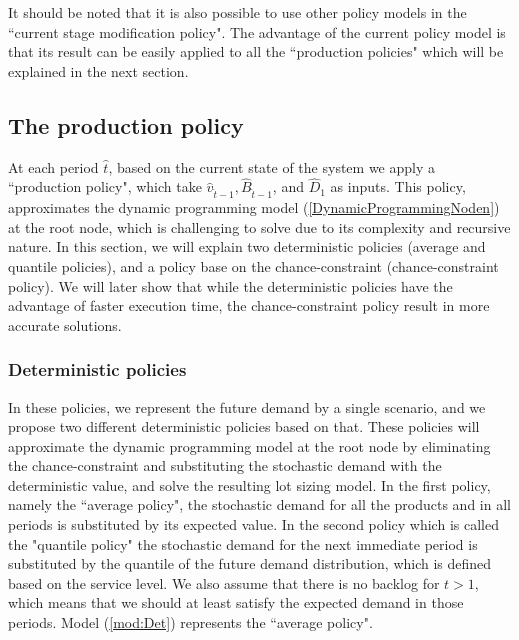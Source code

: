 \documentclass[10pt]{article}
\newcommand{\ti}{t} %
\newcommand{\tAct}{\hat{\ti}} %
\newcommand{\cred}{\color{red!65!black}}
\begin{document}
It should be noted that it is also possible to use other policy models in the ``current stage modification policy". The advantage of the current policy model is that its result can be easily applied to all the ``production policies" which will be explained in the next section.

\subsection{The production policy}
At each period $\tAct$, based on the current state of the system we apply a ``production policy", which take $\hat{v}_{\tAct-1}, \hat{B}_{\tAct-1 }$, and $\hat{D}_1$ as inputs. This policy, approximates the dynamic programming model (\ref{DynamicProgrammingNoden}) at the root node, which is challenging to solve {\cred due to its complexity and recursive nature.}
In this section, we will explain two deterministic policies (average and quantile policies), and a policy base on the chance-constraint (chance-constraint policy). We will later show that while the deterministic policies have the advantage of faster execution time, the chance-constraint policy result in more accurate solutions.
 
\subsubsection{Deterministic policies}

In these policies, we represent the future demand by a single scenario, and we propose two different deterministic policies based on that. 
These policies will approximate the dynamic programming model at the root node
by eliminating the chance-constraint and substituting the stochastic demand  with the deterministic value, and solve the resulting lot sizing model. In the first policy, namely the ``average policy", the stochastic demand for all the products and in all periods is substituted by its expected value. In the second policy which is called the "quantile policy" the stochastic demand for the next immediate period is substituted by the quantile of the future demand distribution, which is defined based on the service level. We also assume that there is no backlog for $\ti > 1$, which means that we should at least satisfy the expected demand in those periods.
Model (\ref{mod:Det}) represents the ``average policy".
\end{document}
